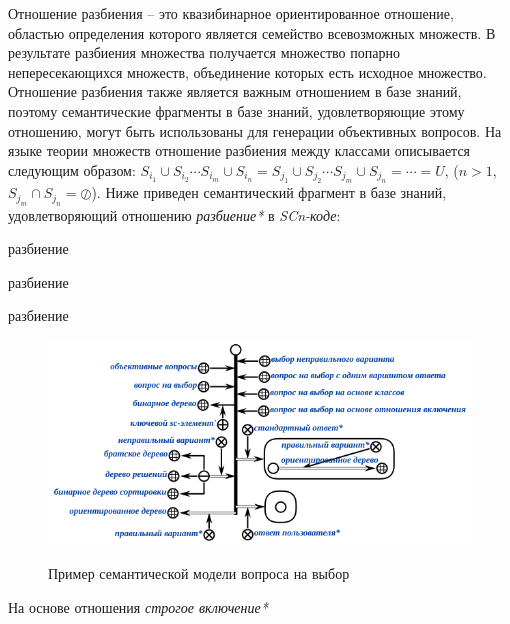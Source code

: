 \begin{textitemize}
\begin{textitemize}
		Отношение разбиения – это квазибинарное ориентированное отношение, областью определения которого является семейство всевозможных множеств. В  результате разбиения множества получается множество попарно непересекающихся множеств, объединение которых есть исходное множество. Отношение разбиения также является важным отношением в базе знаний, поэтому семантические фрагменты в базе знаний, удовлетворяющие этому отношению, могут быть использованы для генерации объективных вопросов. На языке теории множеств отношение разбиения между классами описывается следующим образом: $S_{i_{1}}\cup  S_{i_{2}}\cdots S_{i_{m}} \cup S_{i_{n}} = S_{j_{1}}\cup  S_{j_{2}}\cdots S_{j_{m}} \cup S_{j_{n}}= \cdots = U$, ($n>1$, $S_{j_{m}} \cap S_{j_{n}} = \oslash$). Ниже приведен семантический фрагмент в базе знаний, удовлетворяющий отношению \textit{разбиение*} в \textit{SCn-коде}:
		\begin{SCn}
			\begin{scnrelfromset}{разбиение}
			\end{scnrelfromset}
			\begin{scnrelfromset}{разбиение}
			\end{scnrelfromset}
			\begin{scnrelfromset}{разбиение}
			\end{scnrelfromset}
		\end{SCn}
		\begin{figure}[H]
			\caption{Пример семантической модели вопроса на выбор}
			\includegraphics[scale=1]{author/part7/figures/MC_question_example.png}
			\label{fig:mc_example}
		\end{figure}
		
		\item На основе отношения \textit{строгое включение*}
		

\end{textitemize}
\end{textitemize}
